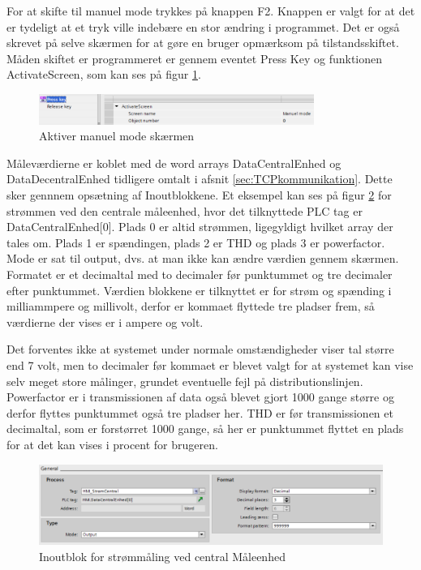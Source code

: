 For at skifte til manuel mode trykkes på knappen F2. Knappen er valgt for at det er tydeligt at et tryk ville indebære en stor ændring i programmet. Det er også skrevet på selve skærmen for at gøre en bruger opmærksom på tilstandsskiftet. Måden skiftet er programmeret er gennem eventet Press Key og funktionen ActivateScreen, som kan ses på figur \ref{fig:ActivateScreen}.

\begin{figure}[H] %
	\centering
	\includegraphics[width=0.8\textwidth]{Figure/ActivateScreen}
	\caption{Aktiver manuel mode skærmen}
	\label{fig:ActivateScreen}
\end{figure}

Måleværdierne er koblet med de word arrays DataCentralEnhed og DataDecentralEnhed tidligere omtalt i afsnit \ref{sec:TCPkommunikation}. Dette sker gennnem opsætning af Inoutblokkene. Et eksempel kan ses på figur \ref{fig:OutputblokMaelingStroemCentral} for strømmen ved den centrale måleenhed, hvor det tilknyttede PLC tag er DataCentralEnhed[0]. Plads 0 er altid strømmen, ligegyldigt hvilket array der tales om. Plads 1 er spændingen, plads 2 er THD og plads 3 er powerfactor. Mode er sat til output, dvs. at man ikke kan ændre værdien gennem skærmen. Formatet er et decimaltal med to decimaler før punktummet og tre decimaler efter punktummet.
Værdien blokkene er tilknyttet er for strøm og spænding i milliammpere og millivolt, derfor er kommaet flyttede tre pladser frem, så værdierne der vises er i ampere og volt.


Det forventes ikke at systemet under normale omstændigheder viser tal større end 7 volt, men to decimaler før kommaet er blevet valgt for at systemet kan vise selv meget store målinger, grundet eventuelle fejl på distributionslinjen. Powerfactor er i transmissionen af data også blevet gjort 1000 gange større og derfor flyttes punktummet også tre pladser her. THD er før transmissionen et decimaltal, som er forstørret 1000 gange, så her er punktummet flyttet en plads for at det kan vises i procent for brugeren.

\begin{figure}[H] %
	\centering
	\includegraphics[width=1\textwidth]{Figure/OutputblokMaelingStroemCentral}
	\caption{Inoutblok for strømmåling ved central Måleenhed}
	\label{fig:OutputblokMaelingStroemCentral}
\end{figure}

